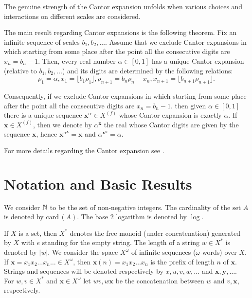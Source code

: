 \documentclass{elsart}
\begin{document}
The genuine strength of the Cantor expansion unfolds
when various choices and  interactions on different scales are
considered.

The main result regarding Cantor expansions is the following theorem.
Fix an infinite sequence of scales $b_1, b_2, \ldots$.  Assume that we
exclude Cantor expansions in which starting from some place after the point
all the consecutive digits are $x_n = b_n -1$. Then, every real number
$\alpha\in [0,1]$ has  a unique Cantor expansion (relative to $b_1, b_2,
\ldots$)
and its digits are determined by the following relations:
\[ \rho_1 = \alpha, x_1 = \lfloor b_1 \rho_1\rfloor, \rho_{n+1} = b_n \rho_n
- x_n, x_{n+1} = \lfloor b_{n+1} \rho_{n+1}\rfloor.\]


Consequently, if we exclude Cantor expansions in which starting from some
place after the point all the consecutive digits are $x_n = b_n -1$. then
given $\alpha \in [0,1]$ there is a unique sequence ${\mathbf x}^{\alpha}\in {X^{(f)}}$
whose Cantor expansion is exactly $\alpha$. If ${\mathbf x} \in {X^{(f)}}$, then we denote
by $\alpha^{{\mathbf x}}$ the real whose Cantor digits are given by the sequence
${\mathbf x}$, hence ${\mathbf x}^{\alpha^{{\mathbf x}}} = {\mathbf x}$ and $ \alpha^{{\mathbf x}^{\alpha}}
 = \alpha$.

For more
details regarding the Cantor expansion see \cite{hardy-54,drobot}.




\section{Notation and Basic Results}

We consider $\Bbb{N}$ to be the set of non-negative integers. The
cardinality of the set $A$ is denoted by ${\mathrm{card}\,}(A)$.  The base 2 logarithm
is denoted by
$\log$.

If $X$ is a  set, then $X^*$ denotes the free monoid (under concatenation)
generated by $X$ with $e$ standing for the empty string. The length of a
string $w \in X^*$ is denoted by $|w|$. We consider the space $X^\omega$ of
infinite sequences ($\omega$-words)
over $X$. If ${\mathbf x} = x_{1}x_{2}\ldots x_{n}\ldots \in X^{\omega}$, then
${\mathbf x}(n)=
x_{1}x_{2}\ldots x_{n} $ is the prefix of length $n$ of ${\mathbf x}$. Strings and
sequences will be denoted respectively by $x, u,v,w, \ldots$ and   ${\mathbf x},
{\mathbf y},
\ldots$. For $w, v\in X^*$ and ${\mathbf x} \in X^\omega$ let  $wv, w{\mathbf x}$ be the
concatenation between $w$ and $v, {\mathbf x}$, respectively.
\end{document}

